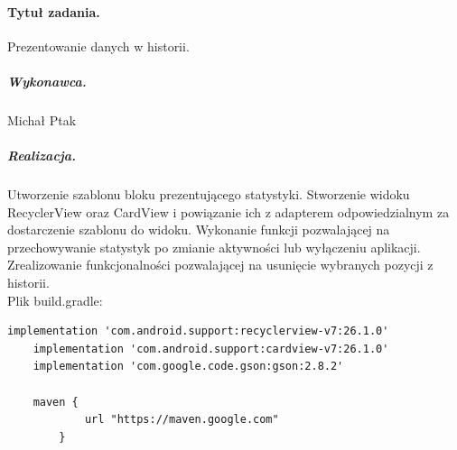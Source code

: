 \documentclass[a4paper]{article}
\begin{document}
\paragraph{Tytuł zadania.} Prezentowanie danych w historii.
\subparagraph{Wykonawca.} Michał Ptak
\subparagraph{Realizacja.} Utworzenie szablonu bloku prezentującego statystyki. Stworzenie widoku RecyclerView oraz CardView i powiązanie ich z adapterem odpowiedzialnym za dostarczenie szablonu do widoku. Wykonanie funkcji pozwalającej na przechowywanie statystyk po zmianie aktywności lub wyłączeniu aplikacji. Zrealizowanie funkcjonalności pozwalającej na usunięcie wybranych pozycji z historii.\\
Plik build.gradle:
\begin{lstlisting}[style=java]
    implementation 'com.android.support:recyclerview-v7:26.1.0'
    implementation 'com.android.support:cardview-v7:26.1.0'
    implementation 'com.google.code.gson:gson:2.8.2'
    
    maven {
            url "https://maven.google.com"
        }
\end{lstlisting}
\end{document}
